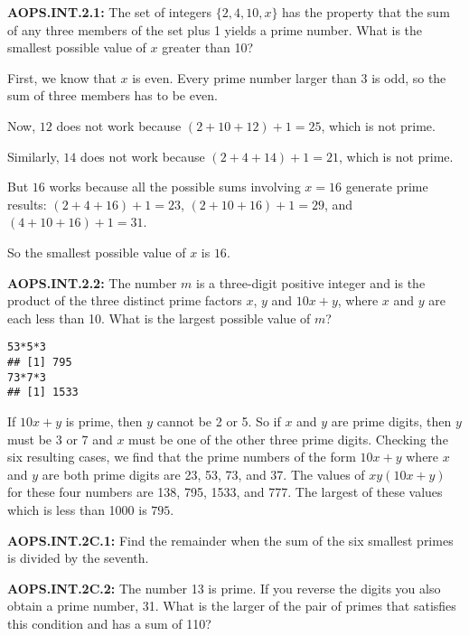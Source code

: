 \documentclass[11pt]{article}
\newenvironment{uzdevums}[1][\unskip]{%
\vspace{3mm}
\noindent
\textbf{#1:}
\noindent}
{}
\begin{document}
\begin{uzdevums}[AOPS.INT.2.1]
The set of integers $\{2,4,10,x\}$ has the property that the sum of any three members of the set plus 1 yields a prime number. What is the smallest possible value of $x$ greater than 10?
\end{uzdevums}

First, we know that $x$ is even. Every prime number larger than $3$ is odd, so the sum of three members has to be even.

Now, $12$ does not work because $(2+10+12)+1=25$, which is not prime.

Similarly, $14$ does not work because $(2+4+14)+1=21$, which is not prime.

But $16$ works because all the possible sums involving $x=16$ generate prime results: $(2+4+16)+1=23$, $(2+10+16)+1=29$, and $(4+10+16)+1=31$.

So the smallest possible value of $x$ is $\boxed{16}$.




\begin{uzdevums}[AOPS.INT.2.2]
The number $m$ is a three-digit positive integer and is the product of the three distinct prime factors $x$, $y$ and $10x+y$, where $x$ and $y$ are each less than 10. What is the largest possible value of $m$?
\end{uzdevums}

\begin{verbatim}
53*5*3
## [1] 795
73*7*3
## [1] 1533
\end{verbatim}

If $10x+y$ is prime, then $y$ cannot be 2 or 5. So if $x$ and $y$ are prime digits, then $y$ must be 3 or 7 and $x$ must be one of the other three prime digits. Checking the six resulting cases, we find that the prime numbers of the form $10x+y$ where $x$ and $y$ are both prime digits are 23, 53, 73, and 37. The values of $xy(10x+y)$ for these four numbers are 138, 795, 1533, and 777. The largest of these values which is less than 1000 is $\boxed{795}$.


\begin{uzdevums}[AOPS.INT.2C.1]
Find the remainder when the sum of the six smallest primes is divided by the seventh.
\end{uzdevums}

\begin{uzdevums}[AOPS.INT.2C.2]
The number 13 is prime. If you reverse the digits you also obtain a prime number, 31. What is the larger of the pair of primes that satisfies this condition and has a sum of 110?
\end{uzdevums}
\end{document}
